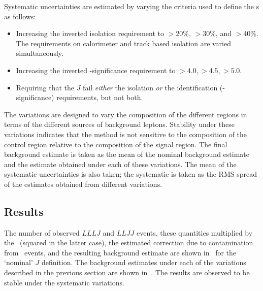 Systematic uncertainties are estimated by varying the criteria used to define
the \lljet s as follows:
\begin{itemize}
\item Increasing the inverted isolation requirement to $>$20\%, $>$30\%, and
$>$40\%. The requirements on calorimeter and track based isolation are varied
simultaneously.
\item Increasing the inverted \dzero-significance requirement to
$>4.0,>4.5,>5.0$.
\item Requiring that the $J$ fail {\it either} the isolation {\it or} the
identification (\dzero-significance) requirements, but not both.
\end{itemize}
The variations are designed to vary the composition of the different regions in
terms of the different sources of background leptons. Stability under these
variations indicates that the method is not sensitive to the composition of the
control region relative to the composition of the signal region. The final
background estimate is taken as the mean of the nominal background estimate and
the estimate obtained under each of these variations. The mean of the systematic
uncertainties is also taken; the systematic is taken as the RMS spread of the
estimates obtained from different variations.


\subsection{Results}

The number of observed $LLLJ$ and $LLJJ$ events, these quantities multiplied by
the \fakefactor\ (squared in the latter case), the estimated correction due to
contamination from \ZZ\ events, and the resulting background estimate are shown
in~ for the `nominal' $J$ definition. The background
estimates under each of the variations described in the previous section are
shown in~. The results are observed to be stable under
the systematic variations.
